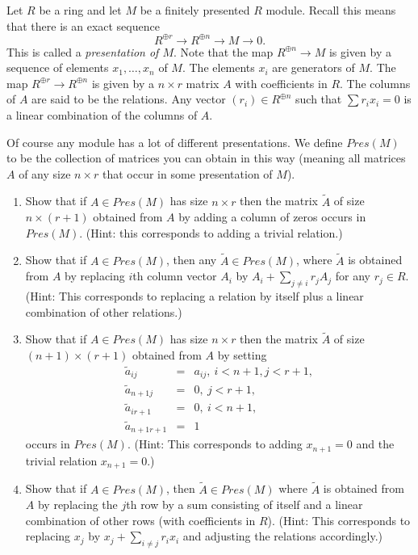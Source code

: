 \begin{exercise}
\label{exercise-fitting}
Let $R$ be a ring and let $M$ be a finitely presented $R$
module. Recall this means that there is an exact sequence
$$
R^{\oplus r} \longrightarrow R^{\oplus n} \longrightarrow M \longrightarrow 0.
$$
This is called a {\it presentation of $M$}.
Note that the map $R^{\oplus n} \to M$
is given by a sequence of elements $x_1, \ldots, x_n$ of $M$. The elements $x_i$
are generators of $M$. The map $R^{\oplus r} \to R^{\oplus n}$ is given by a
$n \times r$ matrix $A$ with coefficients in $R$. The columns of $A$ are said
to be the relations. Any vector $(r_i) \in R^{\oplus n}$ such that
$\sum r_i x_i =0$ is a linear combination of the columns of $A$.

\smallskip\noindent
Of course any module has a lot of different presentations.
We define $Pres(M)$ to be the collection of matrices you can obtain in this
way (meaning all matrices $A$ of any size $n \times r$ that occur in some
presentation of $M$).
\begin{enumerate}
\item Show that if $A\in Pres(M)$ has size $n\times r$ then
the matrix $\tilde A$ of size $n \times (r + 1)$ obtained from $A$ by
adding a column of zeros occurs in $Pres(M)$. (Hint: this corresponds
to adding a trivial relation.)
\item Show that if $A\in Pres(M)$, then any $\tilde A \in Pres(M)$,
where $\tilde A$ is obtained from $A$ by replacing $i$th column vector
$A_i$ by $A_i + \sum_{j\not = i} r_j A_j$ for any $r_j \in R$. (Hint: This
corresponds to replacing a relation by itself plus a linear combination of
other relations.)
\item Show that if $A\in Pres(M)$ has size $n\times r$ then
the matrix $\tilde A$ of size $(n + 1) \times (r + 1)$ obtained from $A$
by setting
\begin{eqnarray*}
\tilde a_{ij}      & = & a_{ij}, \ i<n + 1, j<r + 1, \\
\tilde a_{n + 1 j}   & = & 0, \ j<r + 1, \\
\tilde a_{i r + 1}   & = & 0, \ i<n + 1, \\
\tilde a_{n + 1 r + 1} & = & 1
\end{eqnarray*}
occurs in $Pres(M)$. (Hint: This corresponds to adding $x_{n + 1} = 0$ and
the trivial relation $x_{n + 1} = 0$.)
\item Show that if $A\in Pres(M)$, then $\tilde A \in Pres(M)$
where $\tilde A$ is obtained from $A$ by replacing the $j$th row
by a sum consisting of itself and a linear combination of other
rows (with coefficients in $R$). (Hint: This corresponds to replacing
$x_j$ by $x_j + \sum_{i\not = j} r_i x_i$ and adjusting the relations
accordingly.)


\end{enumerate}
\end{exercise}
